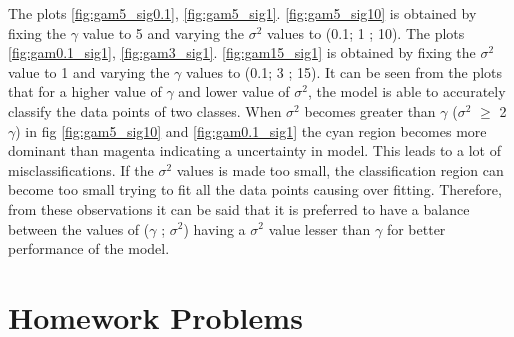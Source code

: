 \documentclass[12pt]{report}
\begin{document}
{The plots \ref{fig:gam5_sig0.1}, \ref{fig:gam5_sig1}. \ref{fig:gam5_sig10} is obtained by fixing the $\gamma$ value to 5 and varying the $\sigma^2$ values to (0.1; 1 ; 10). The plots \ref{fig:gam0.1_sig1}, \ref{fig:gam3_sig1}. \ref{fig:gam15_sig1} is obtained by fixing the $\sigma^2$ value to 1 and varying the $\gamma$ values to (0.1; 3 ; 15). It can be seen from the plots that for a higher value of $\gamma$ and lower value of $\sigma^2$, the model is able to accurately classify the data points of two classes. When $\sigma^2$ becomes greater than $\gamma$ ($\sigma^2$ $\geq$ 2$\gamma$) in fig \ref{fig:gam5_sig10} and \ref{fig:gam0.1_sig1} the cyan region becomes more dominant than magenta indicating a uncertainty in model. This leads to a lot of misclassifications. If the $\sigma^2$ values is made too small, the classification region can become too small trying to fit all the data points causing over fitting. Therefore, from these observations it can be said that it is preferred to have a balance between the values of ($\gamma$ ; $\sigma^2$) having a $\sigma^2$ value lesser than $\gamma$ for better performance of the model.   
\section{Homework Problems}
}
\end{document}
